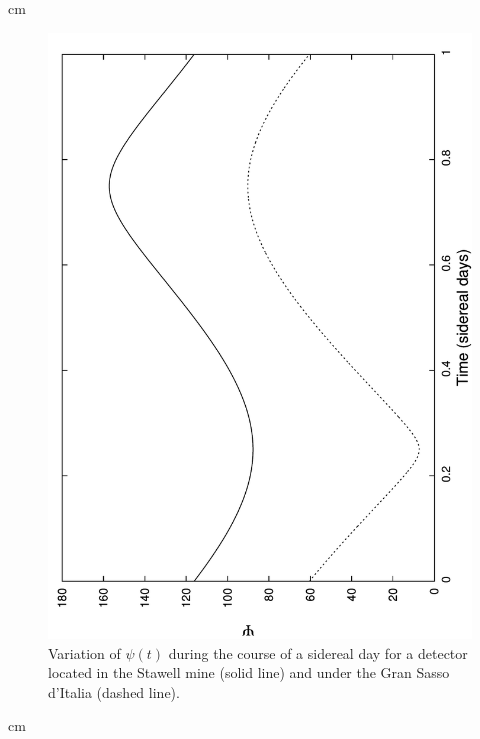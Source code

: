 \documentclass[12pt]{article}
\begin{document}
 cm
%
\begin{figure}[htpb]
    \centering
        \includegraphics[scale=0.5, angle=270]{fig2}
    \caption{Variation of $\psi (t)$ during the course of a sidereal day for a detector located in the Stawell mine (solid line) and under the Gran Sasso d'Italia (dashed line).}
    \label{fig:psit}
\end{figure}
%
 cm
\end{document}
